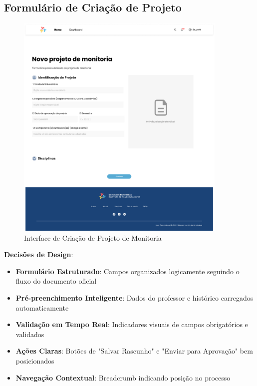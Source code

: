 \documentclass[12pt, a4paper]{report}
\begin{document}
\subsection{Formulário de Criação de Projeto}

\begin{figure}[H]
\centering
\includegraphics[width=0.9\textwidth]{figma/projeto-monitoria.png}
\caption{Interface de Criação de Projeto de Monitoria}
\label{fig:projeto-monitoria}
\end{figure}

\textbf{Decisões de Design}:
\begin{itemize}
    \item \textbf{Formulário Estruturado}: Campos organizados logicamente seguindo o fluxo do documento oficial
    \item \textbf{Pré-preenchimento Inteligente}: Dados do professor e histórico carregados automaticamente
    \item \textbf{Validação em Tempo Real}: Indicadores visuais de campos obrigatórios e validados
    \item \textbf{Ações Claras}: Botões de "Salvar Rascunho" e "Enviar para Aprovação" bem posicionados
    \item \textbf{Navegação Contextual}: Breadcrumb indicando posição no processo
\end{itemize}
\end{document}
